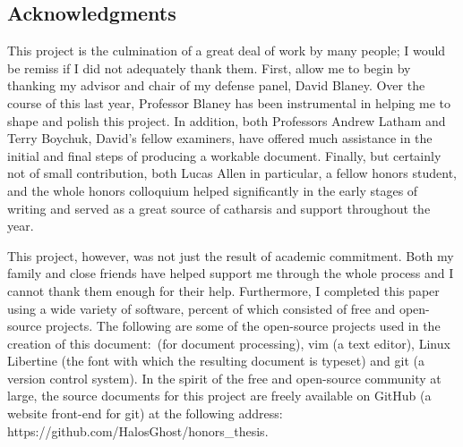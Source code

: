 \documentclass[openany,twoside]{memoir}
\begin{document}
\begin{Spacing}{2}
\chapter{Acknowledgments}
\thispagestyle{fancy}
This project is the culmination of a great deal of work by many people; I would be remiss if I did not adequately thank them.
First, allow me to begin by thanking my advisor and chair of my defense panel, David Blaney.
Over the course of this last year, Professor Blaney has been instrumental in helping me to shape and polish this project.
In addition, both Professors Andrew Latham and Terry Boychuk, David's fellow examiners, have offered much assistance in the initial and final steps of producing a workable document.
Finally, but certainly not of small contribution, both Lucas Allen in particular, a fellow honors student, and the whole honors colloquium helped significantly in the early stages of writing and served as a great source of catharsis and support throughout the year.

This project, however, was not just the result of academic commitment.
Both my family and close friends have helped support me through the whole process and I cannot thank them enough for their help.
Furthermore, I completed this paper using a wide variety of software,  percent of which consisted of free and open-source projects.
The following are some of the open-source projects used in the creation of this document: \XeLaTeX\,(for document processing), vim (a text editor), Linux Libertine (the font with which the resulting document is typeset) and git (a version control system).
In the spirit of the free and open-source community at large, the source documents for this project are freely available on GitHub (a website front-end for git) at the following address: https://github.com/HalosGhost/honors\_thesis.

\newpage{}
\fancyhead[R]{\nouppercase{\leftmark}}
\thispagestyle{empty}
\mbox{}


\end{Spacing}
\end{document}
